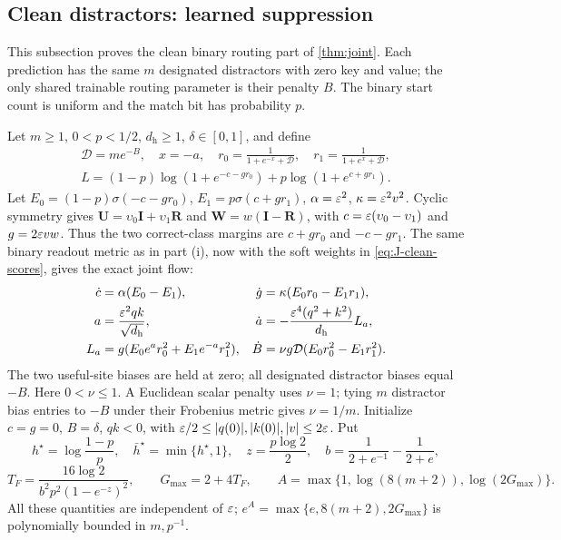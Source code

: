 \subsection{Clean distractors: learned suppression}
\label{app:J-clean}

This subsection proves the clean binary routing part of \cref{thm:joint}. Each prediction has the same $m$ designated distractors
with zero key and value; the only shared trainable routing parameter is their penalty $B$.
The binary start count is uniform and the match bit has probability $p$.

Let $m\ge1$, $0<p<1/2$, $d_{\mathrm h}\ge1$, $\delta\in[0,1]$, and define
\[
 \begin{gathered}
 \mathcal D=me^{-B},\quad x=-a,\quad
 r_0=\frac1{1+e^{-x}+\mathcal D},\quad r_1=\frac1{1+e^x+\mathcal D},\\
 L=(1-p)\log(1+e^{-c-gr_0})+p\log(1+e^{c+gr_1}).
 \end{gathered}
\]
Let $E_0=(1-p)\sigma(-c-gr_0)$, $E_1=p\sigma(c+gr_1)$, $\alpha=\varepsilon^2$, $\kappa=\varepsilon^2v^2$.
Cyclic symmetry gives $\mathbf U=\upsilon_0\mathbf I+\upsilon_1\mathbf R$ and $\mathbf W=w(\mathbf I-\mathbf R)$, with
$c=\varepsilon(\upsilon_0-\upsilon_1)$ and $g=2\varepsilon vw$. Thus the two correct-class margins are $c+gr_0$ and $-c-gr_1$.
The same binary readout metric as in part (i), now with the soft weights in \cref{eq:J-clean-scores}, gives the exact joint flow:
\begin{align*}
 \dot c&=\alpha(E_0-E_1),&
 \dot g&=\kappa(E_0r_0-E_1r_1),\\
 a&=\frac{\varepsilon^2qk}{\sqrt{d_{\mathrm h}}},&
 \dot a&=-\frac{\varepsilon^4(q^2+k^2)}{d_{\mathrm h}}L_a,\\
 L_a&=g(E_0e^a r_0^2+E_1e^{-a}r_1^2),&
 \dot B&=\nu g\mathcal D(E_0r_0^2-E_1r_1^2).
\end{align*}
The two useful-site biases are held at zero; all designated distractor biases equal $-B$.
Here $0<\nu\le1$. A Euclidean scalar penalty uses $\nu=1$; tying $m$ distractor bias entries to $-B$ under their Frobenius metric gives $\nu=1/m$.
Initialize $c=g=0$, $B=\delta$, $qk<0$, with
$\varepsilon/2\le |q(0)|,|k(0)|,|v|\le2\varepsilon$.
Put
\begin{equation}
 h^\star=\log\frac{1-p}{p},\quad \bar h^\star=\min\{h^\star,1\},\quad
 z=\frac{p\log2}{2},\quad
 b=\frac1{2+e^{-1}}-\frac1{2+e},
\end{equation}
\begin{equation}
 T_F=\frac{16\log2}{b^2p^2(1-e^{-z})^2},\qquad
 G_{\max}=2+4T_F,\qquad A=\max\{1,\log(8(m+2)),\log(2G_{\max})\}.
 \label{eq:CR-constants}
\end{equation}
All these quantities are independent of $\varepsilon$; $e^A=\max\{e,8(m+2),2G_{\max}\}$ is polynomially bounded in $m,p^{-1}$.

